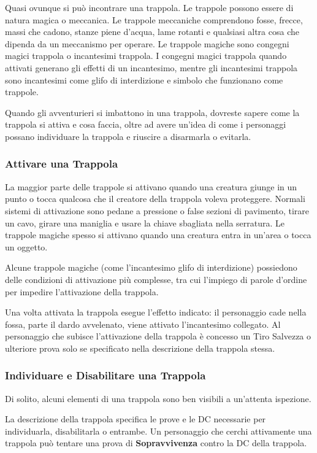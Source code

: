 \begin{multicols}{2}

Quasi ovunque si può incontrare una trappola. Le trappole possono essere di natura magica o meccanica. Le trappole meccaniche comprendono fosse, frecce, massi che cadono, stanze piene d'acqua, lame rotanti e qualsiasi altra cosa che dipenda da un meccanismo per operare. Le trappole magiche sono congegni magici trappola o incantesimi trappola. I congegni magici trappola quando attivati generano gli effetti di un incantesimo, mentre gli incantesimi trappola sono incantesimi come glifo di interdizione e simbolo che funzionano come trappole.

Quando gli avventurieri si imbattono in una trappola, dovreste sapere come la trappola si attiva e cosa faccia, oltre ad avere un'idea di come i personaggi possano individuare la trappola e riuscire a disarmarla o evitarla.

\subsubsection{Attivare una Trappola}
La maggior parte delle trappole si attivano quando una creatura giunge in un punto o tocca qualcosa che il creatore della trappola voleva proteggere. Normali sistemi di attivazione sono pedane a pressione o false sezioni di pavimento, tirare un cavo, girare una maniglia e usare la chiave sbagliata nella serratura. Le trappole magiche spesso si attivano quando una creatura entra in un'area o tocca un oggetto.

Alcune trappole magiche (come l'incantesimo glifo di interdizione) possiedono delle condizioni di attivazione più complesse, tra cui l'impiego di parole d'ordine per impedire l'attivazione della trappola.

Una volta attivata la trappola esegue l'effetto indicato: il personaggio cade nella fossa, parte il dardo avvelenato, viene attivato l'incantesimo collegato. Al personaggio che subisce l'attivazione della trappola è concesso un Tiro Salvezza o ulteriore prova solo se specificato nella descrizione della trappola stessa.

\subsubsection{Individuare e Disabilitare una Trappola}
Di solito, alcuni elementi di una trappola sono ben visibili a un'attenta ispezione.

La descrizione della trappola specifica le prove e le DC necessarie per individuarla, disabilitarla o entrambe. Un personaggio che cerchi attivamente una trappola può tentare una prova di \textbf{Sopravvivenza} contro la DC della trappola.


\end{multicols}
